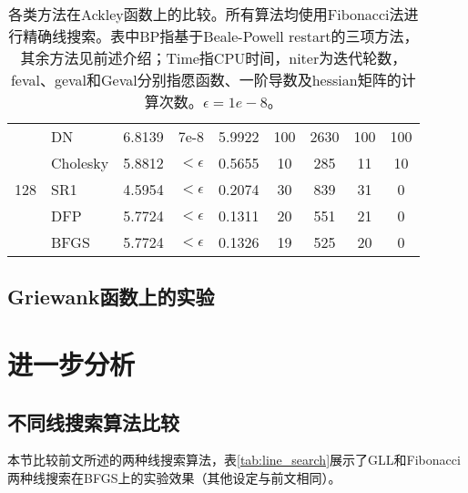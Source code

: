 \documentclass{article}
\begin{document}
\begin{table*}[h]
\begin{tabular}{c l c c c c c c c}
    \cmidrule(lr){1-9}
    \multirow{5}{*}{128} &
    DN & 6.8139 & 7e-8 & 5.9922 & 100 & 2630 & 100 & 100 \\
    & Cholesky & 5.8812 & $<\epsilon$ & 0.5655 & 10 & 285 & 11 & 10 \\
    & SR1 & 4.5954 & $<\epsilon$ & 0.2074 & 30 & 839 & 31 & 0 \\
    & DFP & 5.7724 & $<\epsilon$ & 0.1311 & 20 & 551 & 21 & 0 \\
    & BFGS & 5.7724 & $<\epsilon$ & 0.1326 & 19 & 525 & 20 & 0 \\
    \bottomrule
  \end{tabular}
  \caption{各类方法在Ackley函数上的比较。所有算法均使用Fibonacci法进行精确线搜索。表中BP指基于Beale-Powell restart的三项方法，其余方法见前述介绍；Time指CPU时间，niter为迭代轮数，feval、geval和Geval分别指愿函数、一阶导数及hessian矩阵的计算次数。$\epsilon=1e-8$。}
  \label{tab:ackley}
\end{table*}

\subsection{Griewank函数上的实验}


\section{进一步分析}
\subsection{不同线搜索算法比较}
本节比较前文所述的两种线搜索算法，表\ref{tab:line_search}展示了GLL和Fibonacci两种线搜索在BFGS上的实验效果（其他设定与前文相同）。
\end{document}
